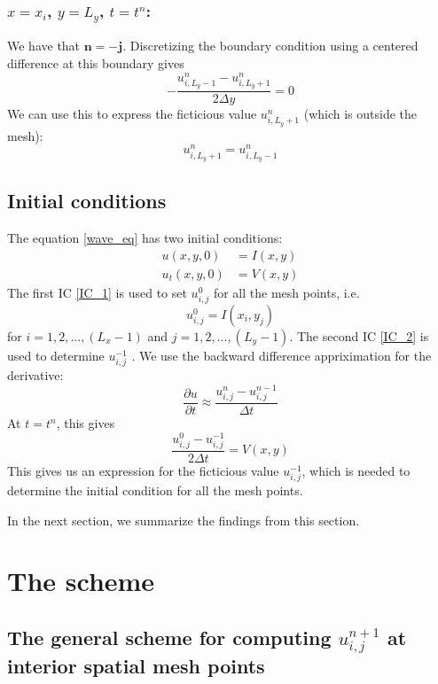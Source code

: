 \documentclass[11pt]{article} %
\newcommand{\bn}{\mathbf{n}}
\newcommand{\bj}{\mathbf{j}}
\newcommand{\Dy}{\Delta y}
\newcommand{\Dt}{\Delta t}
\newcommand{\dut}{\frac{\partial u}{\partial t}}
\newcommand{\unp}{u^{n+1}}
\newcommand{\un}{u^{n}}
\newcommand{\unm}{u^{n-1}}
\begin{document}
\subsubsection{ $x=x_i$, $y = L_y$, $t = t^n$:}
 We have that $\bn = -\bj$. Discretizing the boundary condition using a centered difference at this boundary gives
\begin{equation*}
-\frac{u^n_{i,L_y-1} - u^n_{i,L_y+1}}{2\Dy} = 0
\end{equation*}
We can use this to express the ficticious value $u^n_{i,L_y+1}$ (which is outside the mesh):
\begin{equation}
u^n_{i,L_y+1} = u^n_{i,L_y-1}
\label{bc_yL}
\end{equation}


\subsection{Initial conditions}\label{IC_sec}
The equation \eqref{wave_eq} has two initial conditions:
\begin{subequations}\label{IC_grp}
\begin{align}
u(x,y,0) &= I(x,y)\label{IC_1}\\
u_t(x,y,0) &= V(x,y)\label{IC_2}
\end{align}
\end{subequations}
The first IC \eqref{IC_1} is used to set $u^0_{i,j}$ for all the mesh points, i.e.
\[u^0_{i,j} = I(x_i,y_j)\] for $i = 1, 2, ..., (L_x-1)$ and $j = 1, 2, ..., (L_y-1)$.
The second IC \eqref{IC_2} is used to determine $u^{-1}_{i,j}$ . We use the backward difference appriximation for the derivative:
\begin{equation*}
\dut \approx \frac{\un_{i,j} - \unm_{i,j}}{\Dt}
\end{equation*}
At $t = t^n$, this gives
\begin{equation*}
\frac{u^0_{i,j} - u^{-1}_{i,j}}{2\Dt} = V(x,y)
\end{equation*}
This gives us an expression for the ficticious value $u^{-1}_{i,j}$, which is needed to determine the initial condition for all the mesh points.

In the next section, we summarize the findings from this section. 

\section{The scheme}
\subsection{The general scheme for computing $\unp_{i,j}$ at interior spatial mesh points}
\end{document}
